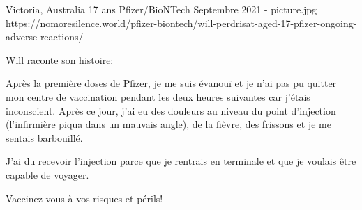 {Victoria, Australia}
{17 ans}
{Pfizer/BioNTech}
{Septembre 2021}
{-}
{picture.jpg}
{https://nomoresilence.world/pfizer-biontech/will-perdrisat-aged-17-pfizer-ongoing-adverse-reactions/}
{
  
Will raconte son histoire:

Après la première doses de Pfizer, je me suis évanouï et je n'ai pas pu quitter mon centre de vaccination pendant les deux heures suivantes car j'étais inconscient. Après ce jour, j'ai eu des douleurs au niveau du point d'injection (l'infirmière piqua dans un mauvais angle), de la fièvre, des frissons et je me sentais barbouillé.

J'ai du recevoir l'injection parce que je rentrais en terminale et que je voulais être capable de voyager.

Vaccinez-vous à vos risques et périls!

}
